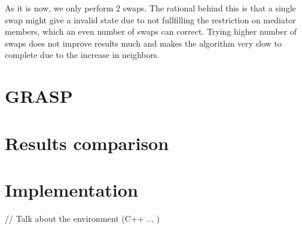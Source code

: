 \documentclass{article}
\begin{document}
As it is now, we only perform 2 swaps. The rational behind this is that a single swap might give a invalid state due to not fullfilling the restriction on mediator members, which an even number of swaps can correct. Trying higher number of swaps does not improve results much and makes the algorithm very slow to complete due to the increase in neighbors.

\section{GRASP}
\section{Results comparison}

\section{Implementation}
// Talk about the environment (C++ ... )
\end{document}
